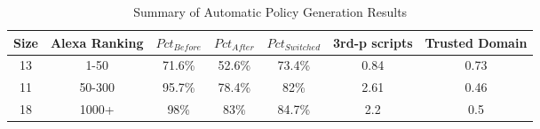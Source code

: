 \begin{table}
\begin{center}
\begin{threeparttable}
\begin{tabular}{|c|c|c|c|c|c|c|}
\hline
 Size\hspace{1mm} & Alexa Ranking\hspace{1mm} & ${Pct}_{Before}$\hspace{1mm} & ${Pct}_{After}$\hspace{1mm} & ${Pct}_{Switched}$\hspace{1mm} &
		3rd-p scripts\hspace{1mm} & Trusted Domain\hspace{1mm} \\
\hline
13 & 1-50 & 71.6\% & 52.6\% & 73.4\% & 0.84 & 0.73\\
\hline
11 & 50-300 & 95.7\% & 78.4\% & 82\% & 2.61 & 0.46\\
\hline
18 & 1000+ & 98\% & 83\% & 84.7\% & 2.2 & 0.5\\
\hline
\end{tabular}
\label{tab:esorics_eval_policystat}
\end{threeparttable}
\end{center}
\caption{Summary of Automatic Policy Generation Results}
\end{table}